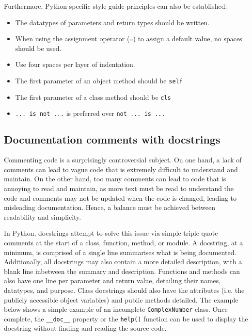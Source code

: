 \documentclass[11pt]{article}
\begin{document}
\noindent
Furthermore, Python specific style guide principles can also be established:

\begin{itemize}
    \item The datatypes of parameters and return types should be written.
    \item When using the assignment operator (\texttt{=}) to assign a default value, no spaces should be used.
    \item Use four spaces per layer of indentation.
    \item The first parameter of an object method should be \texttt{self}
    \item The first parameter of a class method should be \texttt{cls}
    \item \texttt{... is not ...} is preferred over \texttt{not ... is ...}
\end{itemize}

\subsection{Documentation comments with docstrings}

Commenting code is a surprisingly controversial subject. On one hand, a lack of comments can lead to vague code that is extremely difficult to understand and maintain. On the other hand, too many comments can lead to code that is annoying to read and maintain, as more text must be read to understand the code and comments may not be updated when the code is changed, leading to misleading documentation. Hence, a balance must be achieved between readability and simplicity.

In Python, docstrings attempt to solve this issue via simple triple quote comments at the start of a class, function, method, or module. A docstring, at a minimum, is comprised of a single line summarises what is being documented. Additionally, all docstrings may also contain a more detailed description, with a blank line inbetween the summary and description. Functions and methods can also have one line per parameter and return value, detailing their names, datatypes, and purpose. Class docstrings should also have the attributes (i.e. the publicly accessible object variables) and public methods detailed. The example below shows a simple example of an incomplete \texttt{ComplexNumber} class. Once complete, the \texttt{__doc__} property or the \texttt{help()} function can be used to display the docstring without finding and reading the source code.
\end{document}
